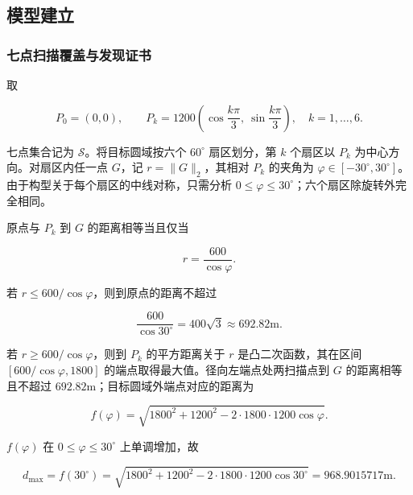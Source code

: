 \subsection{模型建立}

\subsubsection{七点扫描覆盖与发现证书}

取

\begin{equation}
P_0=(0,0),
\qquad
P_k=1200\left(\cos\frac{k\pi}{3},\ \sin\frac{k\pi}{3}\right),
\quad k=1,\ldots,6.
\label{eq:q3_scan_sites}
\end{equation}

七点集合记为 $\mathcal S$。将目标圆域按六个 $60^\circ$ 扇区划分，第 $k$ 个扇区以 $P_k$ 为中心方向。对扇区内任一点 $G$，记 $r=\lVert G\rVert_2$，其相对 $P_k$ 的夹角为 $\varphi\in[-30^\circ,30^\circ]$。由于构型关于每个扇区的中线对称，只需分析 $0\le\varphi\le30^\circ$；六个扇区除旋转外完全相同。

原点与 $P_k$ 到 $G$ 的距离相等当且仅当

\begin{equation}
r=\frac{600}{\cos\varphi}.
\label{eq:q3_voronoi_boundary}
\end{equation}

若 $r\le600/\cos\varphi$，则到原点的距离不超过

\begin{equation}
\frac{600}{\cos30^\circ}=400\sqrt3\approx692.82\mathrm{m}.
\label{eq:q3_inner_bound}
\end{equation}

若 $r\ge600/\cos\varphi$，则到 $P_k$ 的平方距离关于 $r$ 是凸二次函数，其在区间 $[600/\cos\varphi,1800]$ 的端点取得最大值。径向左端点处两扫描点到 $G$ 的距离相等且不超过 $692.82\mathrm{m}$；目标圆域外端点对应的距离为

\begin{equation}
f(\varphi)
=
\sqrt{1800^2+1200^2-2\cdot1800\cdot1200\cos\varphi}.
\label{eq:q3_outer_radial}
\end{equation}

$f(\varphi)$ 在 $0\le\varphi\le30^\circ$ 上单调增加，故

\begin{equation}
d_{\max}
=f(30^\circ)
=
\sqrt{1800^2+1200^2-2\cdot1800\cdot1200\cos30^\circ}
=968.9015717\mathrm{m}.
\label{eq:q3_dmax}
\end{equation}

